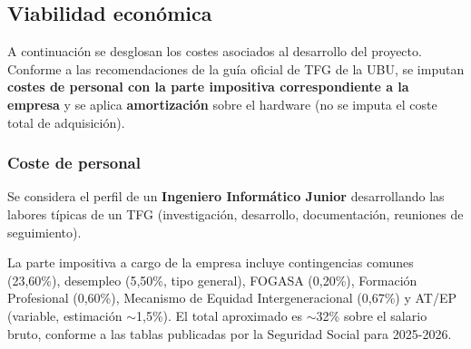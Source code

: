 \subsection{Viabilidad económica}

A continuación se desglosan los costes asociados al desarrollo del proyecto. Conforme a las recomendaciones de la guía oficial de TFG de la UBU, se imputan \textbf{costes de personal con la parte impositiva correspondiente a la empresa} y se aplica \textbf{amortización} sobre el hardware (no se imputa el coste total de adquisición).

\subsubsection{Coste de personal}

Se considera el perfil de un \textbf{Ingeniero Informático Junior} desarrollando las labores típicas de un TFG (investigación, desarrollo, documentación, reuniones de seguimiento).


La parte impositiva a cargo de la empresa incluye contingencias comunes (23,60\%), desempleo (5,50\%, tipo general), FOGASA (0,20\%), Formación Profesional (0,60\%), Mecanismo de Equidad Intergeneracional (0,67\%) y AT/EP (variable, estimación $\sim$1,5\%). El total aproximado es $\sim$32\% sobre el salario bruto, conforme a las tablas publicadas por la Seguridad Social para 2025-2026.


